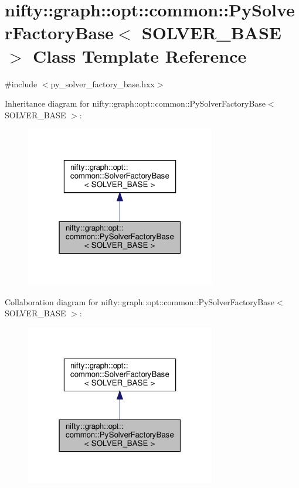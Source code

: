 \hypertarget{classnifty_1_1graph_1_1opt_1_1common_1_1PySolverFactoryBase}{}\section{nifty\+:\+:graph\+:\+:opt\+:\+:common\+:\+:Py\+Solver\+Factory\+Base$<$ S\+O\+L\+V\+E\+R\+\_\+\+B\+A\+SE $>$ Class Template Reference}
\label{classnifty_1_1graph_1_1opt_1_1common_1_1PySolverFactoryBase}


{\ttfamily \#include $<$py\+\_\+solver\+\_\+factory\+\_\+base.\+hxx$>$}



Inheritance diagram for nifty\+:\+:graph\+:\+:opt\+:\+:common\+:\+:Py\+Solver\+Factory\+Base$<$ S\+O\+L\+V\+E\+R\+\_\+\+B\+A\+SE $>$\+:
\nopagebreak
\begin{figure}[H]
\begin{center}
\leavevmode
\includegraphics[width=235pt]{classnifty_1_1graph_1_1opt_1_1common_1_1PySolverFactoryBase__inherit__graph}
\end{center}
\end{figure}


Collaboration diagram for nifty\+:\+:graph\+:\+:opt\+:\+:common\+:\+:Py\+Solver\+Factory\+Base$<$ S\+O\+L\+V\+E\+R\+\_\+\+B\+A\+SE $>$\+:
\nopagebreak
\begin{figure}[H]
\begin{center}
\leavevmode
\includegraphics[width=235pt]{classnifty_1_1graph_1_1opt_1_1common_1_1PySolverFactoryBase__coll__graph}
\end{center}
\end{figure}
